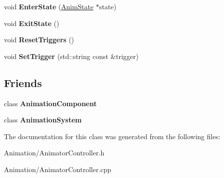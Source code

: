 \begin{DoxyCompactItemize}
void {\bfseries Enter\+State} (\hyperlink{structAnimState}{Anim\+State} $\ast$state)
\item 
\mbox{\label{classAnimatorController_a1dfd902754b35be9c44dfeb86ddc70c2}} 
void {\bfseries Exit\+State} ()
\item 
\mbox{\label{classAnimatorController_a0ebaa0dc9f103ce98f5f330d6e36cb73}} 
void {\bfseries Reset\+Triggers} ()
\item 
\mbox{\label{classAnimatorController_ac98dc31939a3e9b4377f01a0461b158d}} 
void {\bfseries Set\+Trigger} (std\+::string const \&trigger)
\end{DoxyCompactItemize}
\subsection*{Friends}
\begin{DoxyCompactItemize}
\item 
\mbox{\label{classAnimatorController_a47f9e2ec6ae5b27770bda1ead192dd55}} 
class {\bfseries Animation\+Component}
\item 
\mbox{\label{classAnimatorController_a4c8fb761c777f1a874c5d97e052686ad}} 
class {\bfseries Animation\+System}
\end{DoxyCompactItemize}


The documentation for this class was generated from the following files\+:\begin{DoxyCompactItemize}
\item 
Animation/Animator\+Controller.\+h\item 
Animation/Animator\+Controller.\+cpp\end{DoxyCompactItemize}
